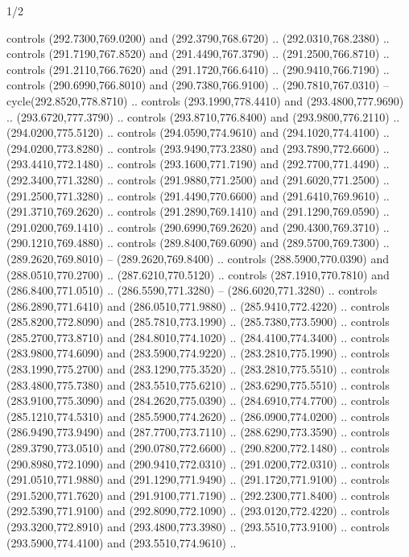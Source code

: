 \begin{flagdescription}{1/2}
\begin{scope}[xshift=0.5\flaglength]
\begin{scope}[scale=0.00745\flagwidth,xshift=-12.1mm,yshift=41.7mm]
\begin{scope}[y=0.80pt, x=0.80pt, yscale=-1, xscale=1, inner sep=0pt, outer sep=0pt]
\begin{scope}[cm={{1.33333,0.0,0.0,-1.33333,(0.0,114.66667)}}]
\begin{scope}[scale=0.100]
  controls (292.7300,769.0200) and (292.3790,768.6720) .. (292.0310,768.2380) ..
  controls (291.7190,767.8520) and (291.4490,767.3790) .. (291.2500,766.8710) ..
  controls (291.2110,766.7620) and (291.1720,766.6410) .. (290.9410,766.7190) ..
  controls (290.6990,766.8010) and (290.7380,766.9100) .. (290.7810,767.0310) --
  cycle(292.8520,778.8710) .. controls (293.1990,778.4410) and
  (293.4800,777.9690) .. (293.6720,777.3790) .. controls (293.8710,776.8400) and
  (293.9800,776.2110) .. (294.0200,775.5120) .. controls (294.0590,774.9610) and
  (294.1020,774.4100) .. (294.0200,773.8280) .. controls (293.9490,773.2380) and
  (293.7890,772.6600) .. (293.4410,772.1480) .. controls (293.1600,771.7190) and
  (292.7700,771.4490) .. (292.3400,771.3280) .. controls (291.9880,771.2500) and
  (291.6020,771.2500) .. (291.2500,771.3280) .. controls (291.4490,770.6600) and
  (291.6410,769.9610) .. (291.3710,769.2620) .. controls (291.2890,769.1410) and
  (291.1290,769.0590) .. (291.0200,769.1410) .. controls (290.6990,769.2620) and
  (290.4300,769.3710) .. (290.1210,769.4880) .. controls (289.8400,769.6090) and
  (289.5700,769.7300) .. (289.2620,769.8010) -- (289.2620,769.8400) .. controls
  (288.5900,770.0390) and (288.0510,770.2700) .. (287.6210,770.5120) .. controls
  (287.1910,770.7810) and (286.8400,771.0510) .. (286.5590,771.3280) --
  (286.6020,771.3280) .. controls (286.2890,771.6410) and (286.0510,771.9880) ..
  (285.9410,772.4220) .. controls (285.8200,772.8090) and (285.7810,773.1990) ..
  (285.7380,773.5900) .. controls (285.2700,773.8710) and (284.8010,774.1020) ..
  (284.4100,774.3400) .. controls (283.9800,774.6090) and (283.5900,774.9220) ..
  (283.2810,775.1990) .. controls (283.1990,775.2700) and (283.1290,775.3520) ..
  (283.2810,775.5510) .. controls (283.4800,775.7380) and (283.5510,775.6210) ..
  (283.6290,775.5510) .. controls (283.9100,775.3090) and (284.2620,775.0390) ..
  (284.6910,774.7700) .. controls (285.1210,774.5310) and (285.5900,774.2620) ..
  (286.0900,774.0200) .. controls (286.9490,773.9490) and (287.7700,773.7110) ..
  (288.6290,773.3590) .. controls (289.3790,773.0510) and (290.0780,772.6600) ..
  (290.8200,772.1480) .. controls (290.8980,772.1090) and (290.9410,772.0310) ..
  (291.0200,772.0310) .. controls (291.0510,771.9880) and (291.1290,771.9490) ..
  (291.1720,771.9100) .. controls (291.5200,771.7620) and (291.9100,771.7190) ..
  (292.2300,771.8400) .. controls (292.5390,771.9100) and (292.8090,772.1090) ..
  (293.0120,772.4220) .. controls (293.3200,772.8910) and (293.4800,773.3980) ..
  (293.5510,773.9100) .. controls (293.5900,774.4100) and (293.5510,774.9610) ..

\end{scope}
\end{scope}
\end{scope}
\end{scope}
\end{scope}
\end{flagdescription}
